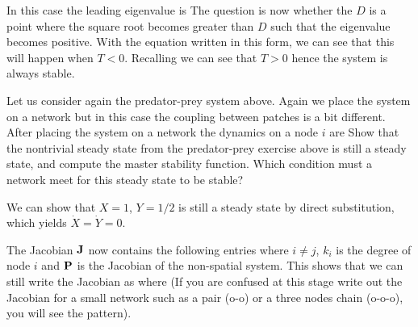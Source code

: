 \solution
In this case the leading eigenvalue is
The question is now whether the $D$ is a point where the square root becomes greater than $D$ such that the eigenvalue becomes positive. With the equation written in this form, we can see that this will happen when $T<0$. Recalling 
we can see that $T>0$ hence the system is always stable.


Let us consider again the predator-prey system above. Again we place the system on a network but in this case the coupling between patches is a bit different. After placing the system on a network the dynamics on a node $i$ are 
Show that the nontrivial steady state from the predator-prey exercise above is still a steady state, and compute the master stability function. Which condition must a network meet for this steady state to be stable?

\solution
We can show that $X=1$, $Y=1/2$ is still a steady state by direct substitution, which yields $\dot{X}=\dot{Y}=0$.

The Jacobian $\bf J$ now contains the following entries
where $i\neq j$, $k_i$ is the degree of node $i$ and $\bf P$ is the Jacobian of the non-spatial system. This shows that we can still write the Jacobian as 
where 
(If you are confused at this stage write out the Jacobian for a small network such as a pair (o-o) or a three nodes chain (o-o-o), you will see the pattern).

